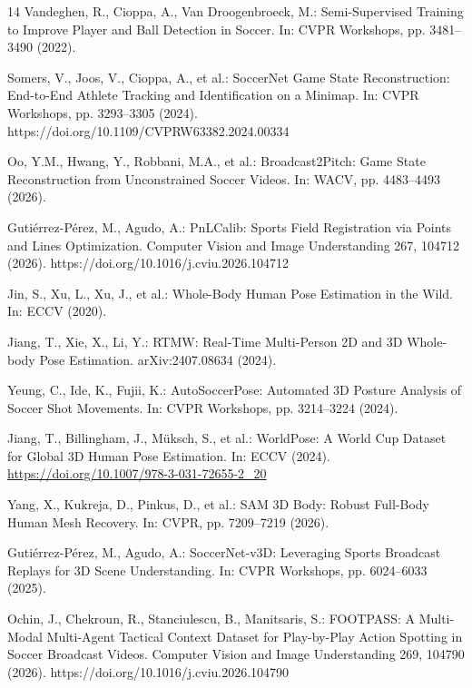 \documentclass[runningheads]{llncs}
\begin{document}
\begin{thebibliography}{14}
Vandeghen, R., Cioppa, A., Van Droogenbroeck, M.: Semi-Supervised Training to Improve Player and Ball Detection in Soccer. In: CVPR Workshops, pp. 3481--3490 (2022).

Somers, V., Joos, V., Cioppa, A., et al.: SoccerNet Game State Reconstruction: End-to-End Athlete Tracking and Identification on a Minimap. In: CVPR Workshops, pp. 3293--3305 (2024). https://doi.org/10.1109/CVPRW63382.2024.00334

Oo, Y.M., Hwang, Y., Robbani, M.A., et al.: Broadcast2Pitch: Game State Reconstruction from Unconstrained Soccer Videos. In: WACV, pp. 4483--4493 (2026).

Guti\'errez-P\'erez, M., Agudo, A.: PnLCalib: Sports Field Registration via Points and Lines Optimization. Computer Vision and Image Understanding 267, 104712 (2026). https://doi.org/10.1016/j.cviu.2026.104712

Jin, S., Xu, L., Xu, J., et al.: Whole-Body Human Pose Estimation in the Wild. In: ECCV (2020).

Jiang, T., Xie, X., Li, Y.: RTMW: Real-Time Multi-Person 2D and 3D Whole-body Pose Estimation. arXiv:2407.08634 (2024).

Yeung, C., Ide, K., Fujii, K.: AutoSoccerPose: Automated 3D Posture Analysis of Soccer Shot Movements. In: CVPR Workshops, pp. 3214--3224 (2024).

Jiang, T., Billingham, J., M\"uksch, S., et al.: WorldPose: A World Cup Dataset for Global 3D Human Pose Estimation. In: ECCV (2024). \url{https://doi.org/10.1007/978-3-031-72655-2_20}

Yang, X., Kukreja, D., Pinkus, D., et al.: SAM 3D Body: Robust Full-Body Human Mesh Recovery. In: CVPR, pp. 7209--7219 (2026).

Guti\'errez-P\'erez, M., Agudo, A.: SoccerNet-v3D: Leveraging Sports Broadcast Replays for 3D Scene Understanding. In: CVPR Workshops, pp. 6024--6033 (2025).

Ochin, J., Chekroun, R., Stanciulescu, B., Manitsaris, S.: FOOTPASS: A Multi-Modal Multi-Agent Tactical Context Dataset for Play-by-Play Action Spotting in Soccer Broadcast Videos. Computer Vision and Image Understanding 269, 104790 (2026). https://doi.org/10.1016/j.cviu.2026.104790


\end{thebibliography}
\end{document}
